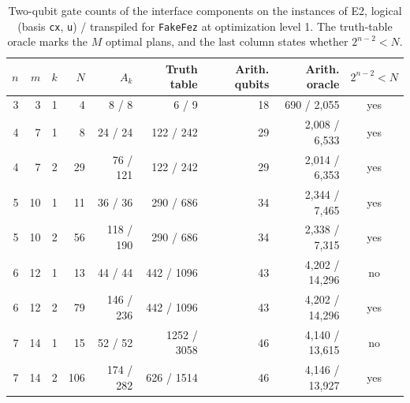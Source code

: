 \begin{table}[t]
\centering
\caption{Two-qubit gate counts of the interface components on the instances of E2, logical (basis \texttt{cx}, \texttt{u}) / transpiled for \texttt{FakeFez} at optimization level 1. The truth-table oracle marks the $M$ optimal plans, and the last column states whether $2^{n-2}<N$.}\label{tab:resources}
\small
\begin{tabular}{rrrrrrrrc}
\toprule
$n$ & $m$ & $k$ & $N$ & $A_k$ & Truth table & Arith. qubits & Arith. oracle & $2^{n-2}<N$ \\
\midrule
3 & 3 & 1 & 4 & 8 / 8 & 6 / 9 & 18 & 690 / 2{,}055 & yes \\
4 & 7 & 1 & 8 & 24 / 24 & 122 / 242 & 29 & 2{,}008 / 6{,}533 & yes \\
4 & 7 & 2 & 29 & 76 / 121 & 122 / 242 & 29 & 2{,}014 / 6{,}353 & yes \\
5 & 10 & 1 & 11 & 36 / 36 & 290 / 686 & 34 & 2{,}344 / 7{,}465 & yes \\
5 & 10 & 2 & 56 & 118 / 190 & 290 / 686 & 34 & 2{,}338 / 7{,}315 & yes \\
6 & 12 & 1 & 13 & 44 / 44 & 442 / 1096 & 43 & 4{,}202 / 14{,}296 & no \\
6 & 12 & 2 & 79 & 146 / 236 & 442 / 1096 & 43 & 4{,}202 / 14{,}296 & yes \\
7 & 14 & 1 & 15 & 52 / 52 & 1252 / 3058 & 46 & 4{,}140 / 13{,}615 & no \\
7 & 14 & 2 & 106 & 174 / 282 & 626 / 1514 & 46 & 4{,}146 / 13{,}927 & yes \\
\bottomrule
\end{tabular}
\end{table}
